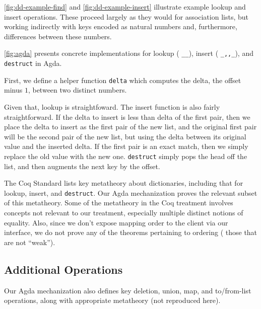 

\autoref{fig:dd-example-find} and \autoref{fig:dd-example-insert} illustrate example lookup and insert operations.
%
These proceed largely as they would for association lists, but working indirectly with keys encoded as natural numbers and, furthermore, differences between these numbers.

\autoref{fig:agda} presents concrete implementations for lookup (\ie{} \texttt{\_\altLAng\_\altRAng}), insert (\ie{} \texttt{\_,,\_}), and \texttt{destruct} in Agda.
%

First, we define a helper function \verb+delta+ which computes the delta, \ie{} the offset minus $1$, between two distinct numbers.

Given that, lookup is straightfoward. The insert function is also fairly straightforward.
%
If the delta to insert is less than delta of the first pair, then we place the delta to insert as the first pair of the new list, and
%
the original first pair will be the second pair of the new list, but using the delta between its original value and the inserted delta.
%
If the first pair is an exact match, then we simply replace the old value with the new one.
%
\verb+destruct+ simply pops the head off the list, and then augments the next key by the offset.

%
The Coq Standard \citet[Facts about weak maps]{FMapFacts} lists key metatheory about dictionaries, including that for lookup, insert, and \verb+destruct+.
%
Our Agda mechanization proves the relevant subset of this metatheory. Some of the metatheory in the Coq treatment involves concepts not relevant to our treatment,
%
especially multiple distinct notions of equality. Also, since we don't expose mapping order to the client via our interface,
%
we do not prove any of the theorems pertaining to ordering (\ie{} those that are not ``weak'').


\subsection{Additional Operations}

Our Agda mechanization also defines key deletion, union, map, and to/from-list operations, along
with appropriate metatheory (not reproduced here).




